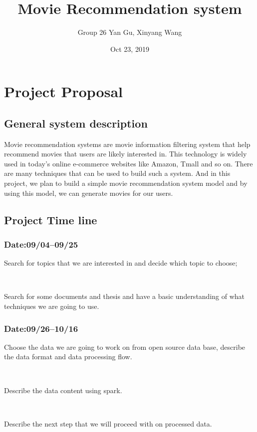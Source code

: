 \documentclass[two column]{article}
\title{Movie Recommendation system }
\author{Group 26 Yan Gu, Xinyang Wang }
\date{Oct 23, 2019 }
\begin{document}
\maketitle
\section{Project Proposal}
\subsection{General system description}
Movie recommendation systems are movie information filtering system that help recommend movies that users are likely interested in. This technology is widely used in today's online e-commerce websites like Amazon, Tmall and so on. There are many techniques that can be used to build such a system. And in this project, we plan to build a simple movie recommendation system model and by using this model, we can generate movies for our users.


\subsection{Project Time line}
\subsubsection{Date:09/04--09/25}
\par Search for topics that we are interested in and decide which topic to choose;
\par ~

\par Search for some documents and thesis and have a basic understanding of what techniques we are going to use.

\subsubsection{Date:09/26--10/16}
\par Choose the data we are going to work on from open source data base, describe the data format and data processing flow.
\par ~

\par Describe the data content using spark.
\par ~

\par Describe the next step that we will proceed with on processed data.
\par ~
\end{document}
